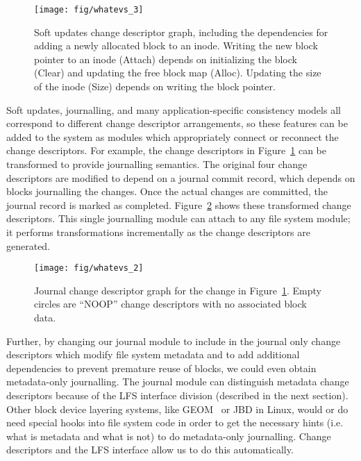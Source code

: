 \begin{figure}[b]
  \centering
  \texttt{[image: fig/whatevs\_3]}%
  \caption{\label{fig:softupdates} Soft updates change descriptor graph,
  including the dependencies for adding a newly allocated block to an
  inode. Writing the new block pointer to an inode (Attach) depends on
  initializing the block (Clear) and updating the free block map (Alloc).
  Updating the size of the inode (Size) depends on writing the block
  pointer.}
\end{figure}

Soft updates, journalling, and many application-specific consistency models all
correspond to different change descriptor arrangements, so these features can be
added to the system as modules which appropriately connect or reconnect the
change descriptors.
%
For example, the change descriptors in Figure~\ref{fig:softupdates} can be
transformed to provide journalling semantics. The original four change
descriptors are modified to depend on a journal commit record, which
depends on blocks journalling the changes. Once the actual changes are
committed, the journal record is marked as completed.
Figure~\ref{fig:journal} shows these transformed change descriptors.
%
This single journalling module can attach to any file system module;
it performs transformations incrementally as the change descriptors
are generated.

\begin{figure}
  \centering
  \texttt{[image: fig/whatevs\_2]}%
  \caption{\label{fig:journal} Journal change descriptor graph for the
    change in Figure~\ref{fig:softupdates}. Empty circles are
    ``NOOP'' change descriptors with no associated block data.}
\end{figure}

Further, by changing our journal module to include in the journal only
change descriptors which modify file system metadata and to add
additional dependencies to prevent premature reuse of blocks, we could
even obtain metadata-only journalling. The journal module can
distinguish metadata change descriptors because of the LFS interface
division (described in the next section).
%
Other block device layering
systems, like GEOM~\cite{geom} or JBD in Linux, would or do need special hooks
into file system code in order to get the necessary hints (i.e.  what is
metadata and what is not) to do metadata-only journalling. Change descriptors
and the LFS interface allow us to do this automatically.
